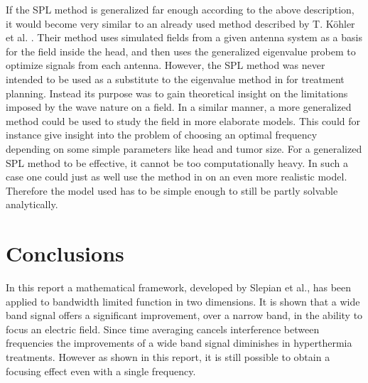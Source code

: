 \documentclass[11pt,a4paper, 
swedish,english %
]{article}
\begin{document}
If the SPL method is generalized far enough according to the above
description, it would become very similar to an already used method
described by T. Köhler et al. \cite{Kohler2001}. Their method uses
simulated fields from a given antenna system as a basis for the field
inside the head, and then uses the generalized eigenvalue probem to
optimize signals from each antenna. 
However, the SPL method was never intended to be used as a substitute
to the eigenvalue method in \cite{Kohler2001} for treatment planning. 
Instead its purpose was to gain theoretical insight on the limitations
imposed by the wave nature on a field. In a similar manner, a more
generalized method could be used to study the field in more elaborate
models. This could for instance give insight into the problem of
choosing an optimal frequency depending on some simple parameters like
head and tumor size.
For a generalized SPL method to be effective, it cannot be too
computationally heavy. In such a case one could just as well use the
method in \cite{Kohler2001} on an even more realistic model. Therefore
the model used has to be simple enough to still be partly solvable
analytically. 






\section{Conclusions}
In this report a mathematical framework, developed by Slepian et al.,
has been applied to bandwidth limited function in two dimensions. It
is shown that a wide band signal offers a significant improvement,
over a narrow band, in the ability to focus an electric field.
Since time averaging cancels interference
between frequencies the improvements of a wide band signal diminishes
in hyperthermia treatments. However as shown in this report, it is
still possible to obtain a focusing effect even with a single
frequency.






\clearpage %
\appendix  %
\end{document}
